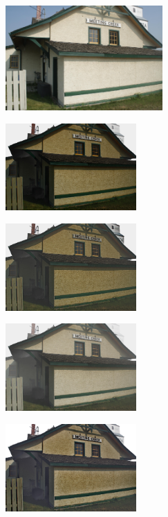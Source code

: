 \begin{figure}[htb]
\begin{subfigure}[b]{1\linewidth}
  \centering
  \centerline{\includegraphics[width=6cm]{hazerd/img/ori_img}}
  \subcaption{}
\end{subfigure}
\vfill
\begin{subfigure}[b]{0.45\linewidth}
  \centering
  \centerline{\includegraphics[width=5cm]{hazerd/img/dehaze_he}}
  \subcaption{}
\end{subfigure}
\hfill
\begin{subfigure}[b]{0.45\linewidth}
  \centering
  \centerline{\includegraphics[width=5cm]{hazerd/img/dehaze_meng}}
  \subcaption{}
\end{subfigure}
\vfill
\begin{subfigure}[b]{0.45\linewidth}
  \centering
  \centerline{\includegraphics[width=5cm]{hazerd/img/dehaze_zhu}}
  \subcaption{}
\end{subfigure}
\hfill
\begin{subfigure}[b]{0.45\linewidth}
  \centering
  \centerline{\includegraphics[width=5cm]{hazerd/img/dehaze_berman}}

\end{subfigure}
\end{figure}
